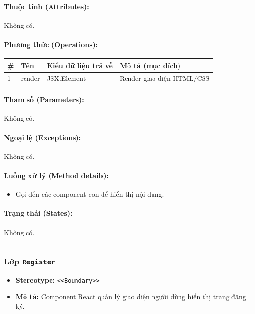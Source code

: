 \documentclass[12pt,a4paper]{article}
\begin{document}
\paragraph{Thuộc tính (Attributes):}
Không có.

\paragraph{Phương thức (Operations):}
\begin{longtable}{|p{0.6cm}|p{3.8cm}|p{2.6cm}|p{6.5cm}|}
\hline
\textbf{\#} & \textbf{Tên} & \textbf{Kiểu dữ liệu trả về} & \textbf{Mô tả (mục đích)} \\ \hline
\endhead
1 & render & JSX.Element & Render giao diện HTML/CSS \\ \hline
\end{longtable}

\paragraph{Tham số (Parameters):}
Không có.

\paragraph{Ngoại lệ (Exceptions):}
Không có.

\paragraph{Luồng xử lý (Method details):}
\begin{itemize}[leftmargin=*]
    \item Gọi đến các component con để hiển thị nội dung.
\end{itemize}


\paragraph{Trạng thái (States):}
Không có.

\vskip 0.5cm
\noindent\rule{\textwidth}{0.5pt}
\vskip 0.5cm

\subsubsection{Lớp \texttt{Register}}
\begin{itemize}[leftmargin=*]
    \item \textbf{Stereotype:} \texttt{\textless{}\textless{}Boundary\textgreater{}\textgreater{}}
    \item \textbf{Mô tả:} Component React quản lý giao diện người dùng hiển thị trang đăng ký.
\end{itemize}
\end{document}
